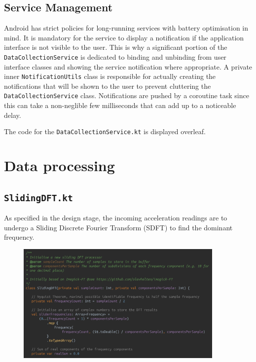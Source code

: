 \documentclass[11pt,twoside,a4paper]{report}
\begin{document}
\subsection{Service Management}

Android has strict policies for long-running services with battery optimisation in mind. It is mandatory for the service to display a notification if the application interface is not visible to the user. This is why a significant portion of the \texttt{DataCollectionService} is dedicated to binding and unbinding from user interface classes and showing the service notification where appropriate. A private inner \texttt{NotificationUtils} class is responsible for actually creating the notifications that will be shown to the user to prevent cluttering the \texttt{DataCollectionService} class. Notifications are pushed by a coroutine task since this can take a non-neglible few milliseconds that can add up to a noticeable delay.

The code for the \texttt{DataCollectionService.kt} is displayed overleaf.



\section{Data processing}

\subsection{\texttt{SlidingDFT.kt}}

As specified in the design stage, the incoming acceleration readings are to undergo a Sliding Discrete Fourier Transform (SDFT) to find the dominant frequency.

\begin{figure}[h!]
  \centering
  \includegraphics[width=0.9\textwidth]{code-slidingDFT.png}
  \caption{}
  \label{fig:slidingDFT}
\end{figure}
\end{document}
